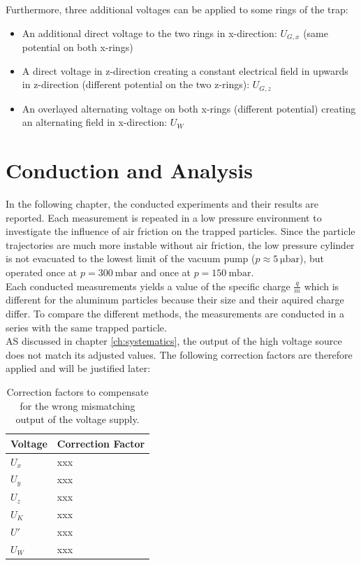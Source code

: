 \documentclass[
	paper=A4,
	parskip=full,
	chapterprefix=true,
	11pt,
	headings=normal,
	bibliography=totoc,
	listof=totoc,
	titlepage=on,
]{scrreprt}
\begin{document}
Furthermore, three additional voltages can be applied to some rings of the trap:
\begin{itemize}
	\item An additional direct voltage to the two rings in x-direction: $U_{G,x}$ (same potential on both x-rings)
	\item A direct voltage in z-direction creating a constant electrical field in upwards in z-direction (different potential on the two z-rings): $U_{G,z}$
	\item An overlayed alternating voltage on both x-rings (different potential) creating an alternating field in x-direction: $U_W$
\end{itemize}





\chapter{Conduction and Analysis}

In the following chapter, the conducted experiments and their results are reported. Each measurement is repeated in a low pressure environment to investigate the influence of air friction on the trapped particles. Since the particle trajectories are much more instable without air friction, the low pressure cylinder is not evacuated to the lowest limit of the vacuum pump ($p \approx \SI{5}{\micro \bar}$), but operated once at $p = \SI{300}{\milli \bar}$ and once at $p = \SI{150}{\milli \bar}$. \\
Each conducted measurements yields a value of the specific charge $\frac{q}{m}$ which is different for the aluminum particles because their size and their aquired charge differ. To compare the different methods, the measurements are conducted in a series with the same trapped particle.\\
AS discussed in chapter \ref{ch:systematics}, the output of the high voltage source does not match its adjusted values. The following correction factors are therefore applied and will be justified later:

\begin{table}[htbp]
	\centering
	\begin{tabular}{ 
			l
			l
		}
		\toprule
		Voltage & Correction Factor \\ 
		\midrule
		$U_x$ & xxx \\
		$U_y$ & xxx \\
		$U_z$ & xxx \\
		$U_K$ & xxx \\
		$U'$ & xxx \\
		$U_W$ & xxx \\
		
		\bottomrule
	\end{tabular}
	\caption{Correction factors to compensate for the wrong mismatching output of the voltage supply.}
	\label{tbl:corr_factors}
\end{table}
\end{document}
